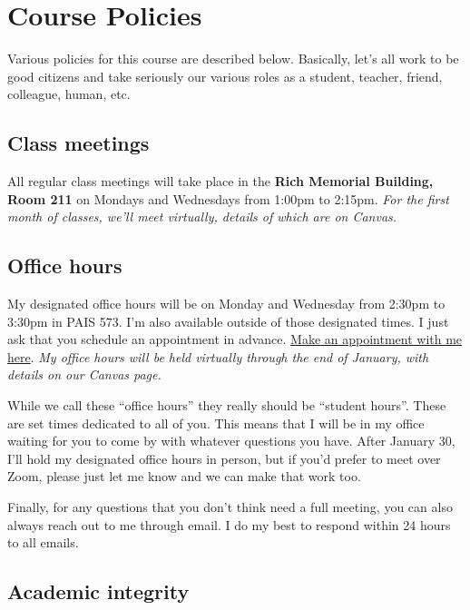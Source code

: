 \documentclass[11pt,]{article}
\begin{document}
\hypertarget{course-policies}{%
\section{Course Policies}\label{course-policies}}

Various policies for this course are described below. Basically, let's
all work to be good citizens and take seriously our various roles as a
student, teacher, friend, colleague, human, etc.

\hypertarget{class-meetings}{%
\subsection{Class meetings}\label{class-meetings}}

All regular class meetings will take place in the \textbf{Rich Memorial
Building, Room 211} on Mondays and Wednesdays from 1:00pm to 2:15pm.
\emph{For the first month of classes, we'll meet virtually, details of
which are on Canvas.}

\hypertarget{office-hours}{%
\subsection{Office hours}\label{office-hours}}

My designated office hours will be on Monday and Wednesday from 2:30pm
to 3:30pm in PAIS 573. I'm also available outside of those designated
times. I just ask that you schedule an appointment in advance.
\href{https://mccarthy-meetings.youcanbook.me/}{Make an appointment with
me here}. \emph{My office hours will be held virtually through the end
of January, with details on our Canvas page.}

While we call these ``office hours'' they really should be ``student
hours''. These are set times dedicated to all of you. This means that I
will be in my office waiting for you to come by with whatever questions
you have. After January 30, I'll hold my designated office hours in
person, but if you'd prefer to meet over Zoom, please just let me know
and we can make that work too.

Finally, for any questions that you don't think need a full meeting, you
can also always reach out to me through email. I do my best to respond
within 24 hours to all emails.

\hypertarget{academic-integrity}{%
\subsection{Academic integrity}\label{academic-integrity}}
\end{document}
